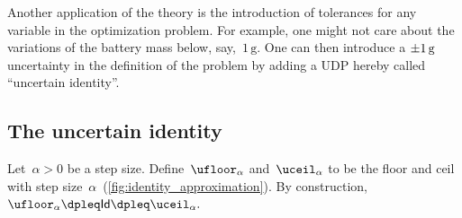 Another application of the theory is the introduction of tolerances
for any variable in the optimization problem. For example, one might
not care about the variations of the battery mass below, say,~$1\,\text{g}$.
One can then introduce a $\pm1\,\text{\ensuremath{\text{g}} }$ uncertainty
in the definition of the problem by adding a UDP hereby called ``uncertain
identity''.


\subsection{The uncertain identity}

Let~$\alpha>0$ be a step size. Define~$\ufloor_{\alpha}$ and~$\uceil_{\alpha}$
to be the floor and ceil with step size~$\alpha$~(\cref{fig:identity_approximation}).
By construction, $\ufloor_{\alpha}\dpleq\mathsf{Id}\dpleq\uceil_{\alpha}.$


